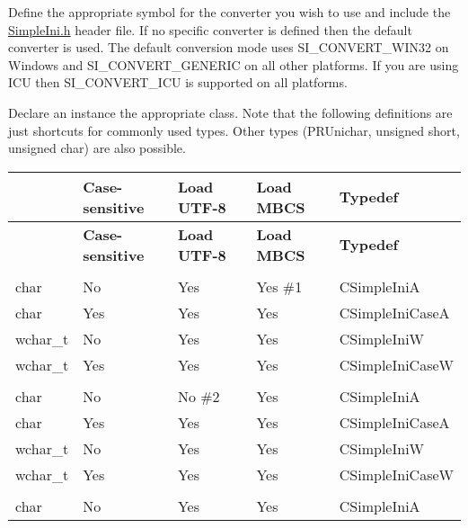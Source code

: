 \begin{DoxyEnumerate}
\item Define the appropriate symbol for the converter you wish to use and include the \hyperlink{SimpleIni_8h_source}{Simple\+Ini.\+h} header file. If no specific converter is defined then the default converter is used. The default conversion mode uses S\+I\+\_\+\+C\+O\+N\+V\+E\+R\+T\+\_\+\+W\+I\+N32 on Windows and S\+I\+\_\+\+C\+O\+N\+V\+E\+R\+T\+\_\+\+G\+E\+N\+E\+R\+IC on all other platforms. If you are using I\+CU then S\+I\+\_\+\+C\+O\+N\+V\+E\+R\+T\+\_\+\+I\+CU is supported on all platforms.
\item Declare an instance the appropriate class. Note that the following definitions are just shortcuts for commonly used types. Other types (P\+R\+Unichar, unsigned short, unsigned char) are also possible. \tabulinesep=1mm
\begin{longtabu} spread 0pt [c]{*5{|X[-1]}|}
\hline
{}&{\bf Case-\/sensitive }&{\bf Load U\+T\+F-\/8 }&{\bf Load M\+B\+CS }&{\bf Typedef }\\
\endfirsthead
\hline
\endfoot
\hline
{}&{\bf Case-\/sensitive }&{\bf Load U\+T\+F-\/8 }&{\bf Load M\+B\+CS }&{\bf Typedef }\\
\endhead
{}\\
char &No &Yes &Yes \#1 &C\+Simple\+IniA \\
char &Yes &Yes &Yes &C\+Simple\+Ini\+CaseA \\
wchar\+\_\+t &No &Yes &Yes &C\+Simple\+IniW \\
wchar\+\_\+t &Yes &Yes &Yes &C\+Simple\+Ini\+CaseW \\
\\
char &No &No \#2 &Yes &C\+Simple\+IniA \\
char &Yes &Yes &Yes &C\+Simple\+Ini\+CaseA \\
wchar\+\_\+t &No &Yes &Yes &C\+Simple\+IniW \\
wchar\+\_\+t &Yes &Yes &Yes &C\+Simple\+Ini\+CaseW \\
\\
char &No &Yes &Yes &C\+Simple\+IniA \\

\end{longtabu}
\end{DoxyEnumerate}
